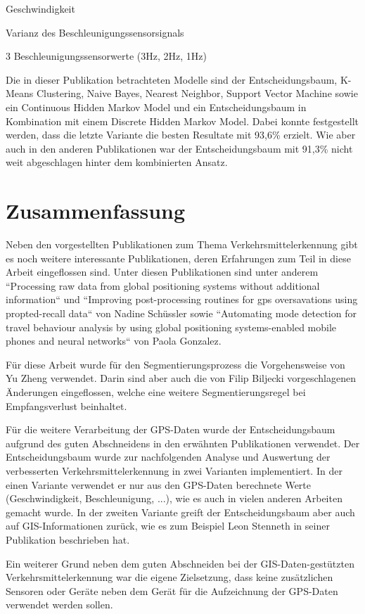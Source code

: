 \begin{pitemize}
\item Geschwindigkeit
\item Varianz des Beschleunigungssensorsignals
\item 3 Beschleunigungssensorwerte (3Hz, 2Hz, 1Hz)
\end{pitemize}

Die in dieser Publikation betrachteten Modelle sind der Entscheidungsbaum, K-Means Clustering, Naive Bayes, Nearest Neighbor, Support Vector Machine sowie ein Continuous Hidden Markov Model und ein Entscheidungsbaum in Kombination mit einem Discrete Hidden Markov Model. Dabei konnte festgestellt werden, dass die letzte Variante die besten Resultate mit 93,6\% erzielt. Wie aber auch in den anderen Publikationen war der Entscheidungsbaum mit 91,3\% nicht weit abgeschlagen hinter dem kombinierten Ansatz.

\section{Zusammenfassung}

Neben den vorgestellten Publikationen zum Thema Verkehrsmittelerkennung gibt es noch weitere interessante Publikationen, deren Erfahrungen zum Teil in diese Arbeit eingeflossen sind. Unter diesen Publikationen sind unter anderem ``Processing raw data from global positioning systems without additional information`` \cite{schuessler_processing_2009}  und  ``Improving post-processing routines for gps oversavations using propted-recall data`` \cite{nadine_schussler_improving_2011} von Nadine Schüssler sowie ``Automating mode detection for travel behaviour analysis by using global positioning systems-enabled mobile phones and neural networks`` \cite{gonzalez_automating_2010} von Paola Gonzalez.

Für diese Arbeit wurde für den Segmentierungsprozess die Vorgehensweise von Yu Zheng \cite{zheng_understanding_2010} verwendet. Darin sind aber auch die von Filip Biljecki \cite{biljecki_transportation_2013} vorgeschlagenen Änderungen eingeflossen, welche eine weitere Segmentierungsregel bei Empfangsverlust beinhaltet. 

Für die weitere Verarbeitung der GPS-Daten wurde der Entscheidungsbaum aufgrund des guten Abschneidens in den erwähnten Publikationen verwendet. Der Entscheidungsbaum wurde zur nachfolgenden Analyse und Auswertung der verbesserten Verkehrsmittelerkennung in zwei Varianten implementiert. In der einen Variante verwendet er nur aus den GPS-Daten berechnete Werte (Geschwindigkeit, Beschleunigung, ...), wie es auch in vielen anderen Arbeiten gemacht wurde. In der zweiten Variante greift der Entscheidungsbaum aber auch auf GIS-Informationen zurück, wie es zum Beispiel Leon Stenneth in seiner Publikation  \cite{stenneth_transportation_2011} beschrieben hat.

Ein weiterer Grund neben dem guten Abschneiden bei der GIS-Daten-gestützten Verkehrsmittelerkennung war die eigene Zielsetzung, dass keine zusätzlichen Sensoren oder Geräte neben dem Gerät für die Aufzeichnung der GPS-Daten verwendet werden sollen.
